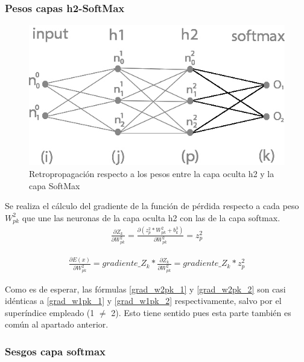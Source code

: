 \subsubsection{Pesos capas h2-SoftMax}

\begin{figure}[H]
	\centering
	\includegraphics[scale=0.35]{imagenes/nn_2_capa_pesos_h2_output.jpg}  
	\caption{Retropropagación respecto a los pesos entre la capa oculta h2 y la capa SoftMax}
\end{figure}

Se realiza el cálculo del gradiente de la función de pérdida respecto a cada peso $W^2_{pk}$ que une las neuronas de la capa oculta h2 con las de la capa softmax. \\

\begin{gather}
	\frac{\partial Z_k}{\partial W^2_{pk}} = \frac{\partial (z^2_p * W^2 _{pk} + b^3_k)}{\partial W^2_{pk }} = z^2_p 
	\label{grad_w2pk_1}
\end{gather}

\begin{gather}
	\frac{\partial E(x)}{\partial W^2_{pk }} =  gradiente\_Z_k * \frac{\partial Z_k}{\partial W^2_{pk }} = gradiente\_Z_k * z^2_p
	\label{grad_w2pk_2}
\end{gather}

Como es de esperar, las fórmulas \ref{grad_w2pk_1} y \ref{grad_w2pk_2} son casi idénticas a \ref{grad_w1pk_1} y \ref{grad_w1pk_2} respectivamente, salvo por el superíndice empleado (1 $\neq$ 2). Esto tiene sentido pues esta parte también es común al apartado anterior.

\subsubsection{Sesgos capa softmax}

